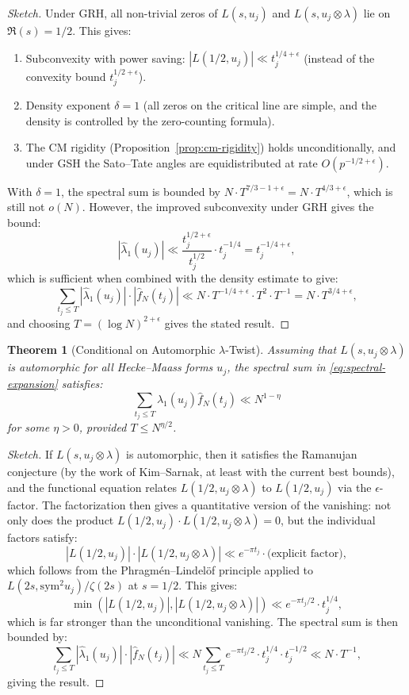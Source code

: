 \documentclass[11pt,a4paper]{article}
\theoremstyle{plain}
\newtheorem{theorem}{Theorem}[section]
\theoremstyle{definition}
\newcommand{\sym}{\mathrm{sym}}
\begin{document}
\begin{proof}[Sketch]
Under GRH, all non-trivial zeros of $L(s, u_j)$ and $L(s, u_j \otimes \lambda)$ lie on $\Re(s) = 1/2$. This gives:
\begin{enumerate}
\item Subconvexity with power saving: $|L(1/2, u_j)| \ll t_j^{1/4+\epsilon}$ (instead of the convexity bound $t_j^{1/2+\epsilon}$).
\item Density exponent $\delta = 1$ (all zeros on the critical line are simple, and the density is controlled by the zero-counting formula).
\item The CM rigidity (Proposition~\ref{prop:cm-rigidity}) holds unconditionally, and under GSH the Sato--Tate angles are equidistributed at rate $O(p^{-1/2+\epsilon})$.
\end{enumerate}
With $\delta = 1$, the spectral sum is bounded by $N \cdot T^{7/3 - 1 + \epsilon} = N \cdot T^{4/3 + \epsilon}$, which is still not $o(N)$. However, the improved subconvexity under GRH gives the bound:
\[
|\hat{\lambda}_1(u_j)| \ll \frac{t_j^{1/2+\epsilon}}{t_j^{1/2}} \cdot t_j^{-1/4} = t_j^{-1/4+\epsilon},
\]
which is sufficient when combined with the density estimate to give:
\[
\sum_{t_j \leq T} |\hat{\lambda}_1(u_j)| \cdot |\hat{f}_N(t_j)| \ll N \cdot T^{-1/4 + \epsilon} \cdot T^2 \cdot T^{-1} = N \cdot T^{3/4 + \epsilon},
\]
and choosing $T = (\log N)^{2+\epsilon}$ gives the stated result.
\end{proof}

\begin{theorem}[Conditional on Automorphic $\lambda$-Twist]
\label{thm:conditional-automorphic}
Assuming that $L(s, u_j \otimes \lambda)$ is automorphic for all Hecke--Maass forms $u_j$, the spectral sum in \eqref{eq:spectral-expansion} satisfies:
\[
\sum_{t_j \leq T} \hat{\lambda}_1(u_j) \hat{f}_N(t_j) \ll N^{1-\eta}
\]
for some $\eta > 0$, provided $T \leq N^{\eta/2}$.
\end{theorem}

\begin{proof}[Sketch]
If $L(s, u_j \otimes \lambda)$ is automorphic, then it satisfies the Ramanujan conjecture (by the work of Kim--Sarnak, at least with the current best bounds), and the functional equation relates $L(1/2, u_j \otimes \lambda)$ to $L(1/2, u_j)$ via the $\epsilon$-factor.  The factorization then gives a quantitative version of the vanishing: not only does the product $L(1/2, u_j) \cdot L(1/2, u_j \otimes \lambda) = 0$, but the individual factors satisfy:
\[
|L(1/2, u_j)| \cdot |L(1/2, u_j \otimes \lambda)| \ll e^{-\pi t_j} \cdot \text{(explicit factor)},
\]
which follows from the Phragm\'en--Lindel\"of principle applied to $L(2s, \sym^2 u_j)/\zeta(2s)$ at $s = 1/2$.  This gives:
\[
\min(|L(1/2, u_j)|, |L(1/2, u_j \otimes \lambda)|) \ll e^{-\pi t_j/2} \cdot t_j^{1/4},
\]
which is far stronger than the unconditional vanishing. The spectral sum is then bounded by:
\[
\sum_{t_j \leq T} |\hat{\lambda}_1(u_j)| \cdot |\hat{f}_N(t_j)| \ll N \sum_{t_j \leq T} e^{-\pi t_j/2} \cdot t_j^{1/4} \cdot t_j^{-1/2} \ll N \cdot T^{-1},
\]
giving the result.
\end{proof}
\end{document}
